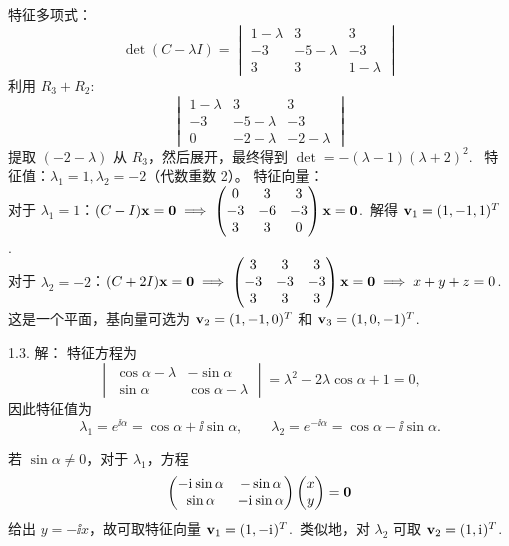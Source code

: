 \begin{exer}
特征多项式：
$$ \det(C-\lambda I) = \begin{vmatrix} 1-\lambda & 3 & 3 \\ -3 & -5-\lambda & -3 \\ 3 & 3 & 1-\lambda \end{vmatrix} $$
利用 $R_3 + R_2$:
$$ \begin{vmatrix} 1-\lambda & 3 & 3 \\ -3 & -5-\lambda & -3 \\ 0 & -2-\lambda & -2-\lambda \end{vmatrix} $$
提取 $(-2-\lambda)$ 从 $R_3$，然后展开，最终得到 $\det = -(\lambda-1)(\lambda+2)^2$.~
特征值：$\lambda_1 = 1, \lambda_2 = -2$（代数重数 2）。
特征向量：\\
对于 $\lambda_1 = 1$：$(C-I)\mathbf{x} = \mathbf{0} \implies \begin{pmatrix} 0 & 3 & 3 \\ -3 & -6 & -3 \\ 3 & 3 & 0 \end{pmatrix} \mathbf{x} = \mathbf{0}$.~解得 $\mathbf{v}_1 = (1, -1, 1)^T$.~\\
对于 $\lambda_2 = -2$：$(C+2I)\mathbf{x} = \mathbf{0} \implies \begin{pmatrix} 3 & 3 & 3 \\ -3 & -3 & -3 \\ 3 & 3 & 3 \end{pmatrix} \mathbf{x} = \mathbf{0} \implies x+y+z=0$.~\\
这是一个平面，基向量可选为 $\mathbf{v}_2 = (1, -1, 0)^T$ 和 $\mathbf{v}_3 = (1, 0, -1)^T$.~

1.3. 解：
特征方程为
$$ \begin{vmatrix} \cos \alpha - \lambda & -\sin \alpha \\ \sin \alpha & \cos \alpha - \lambda \end{vmatrix}
= \lambda^2 - 2\lambda\cos\alpha + 1=0,$$
因此特征值为
$$\lambda_1=e^{\ii\alpha}=\cos\alpha+\ii\sin\alpha,\qquad
\lambda_2=e^{-\ii\alpha}=\cos\alpha-\ii\sin\alpha.$$

若 $\sin\alpha\neq0$，对于 $\lambda_1$，方程
$$\begin{pmatrix}-\mathrm{i}\mkern1mu\sin\alpha&-\sin\alpha\\ \sin\alpha&-\mathrm{i}\mkern1mu\sin\alpha\end{pmatrix}\begin{pmatrix}x\\y\end{pmatrix}=\mathbf{0}$$
给出 $y=-\ii x$，故可取特征向量 $\mathbf{v}_1=(1,-\mathrm{i}\mkern1mu)^T$.~类似地，对 $\lambda_2$ 可取 $\mathbf{v}_2=(1,\mathrm{i}\mkern1mu)^T$.


\end{exer}
